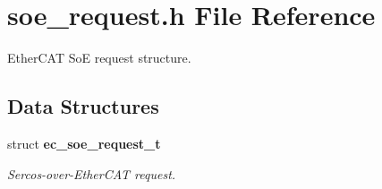 \section{soe\-\_\-request.\-h File Reference}
\label{soe__request_8h}


Ether\-C\-A\-T So\-E request structure.  


\subsection*{Data Structures}
\begin{DoxyCompactItemize}
\item 
struct {\bf ec\-\_\-soe\-\_\-request\-\_\-t}
\begin{DoxyCompactList}\small\item\em Sercos-\/over-\/\-Ether\-C\-A\-T request. \end{DoxyCompactList}\end{DoxyCompactItemize}
